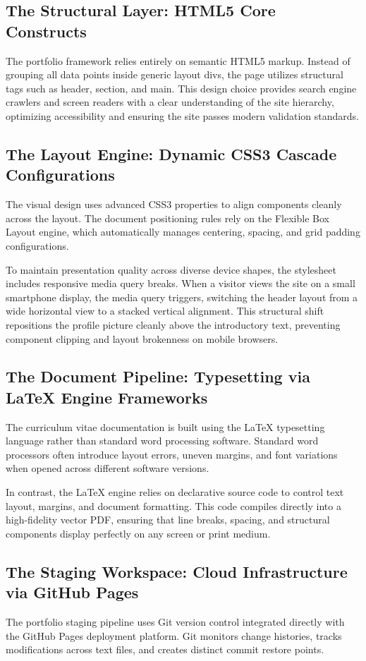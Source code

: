 \documentclass[12pt,a4paper]{article}
\begin{document}
\subsection{The Structural Layer: HTML5 Core Constructs}
The portfolio framework relies entirely on semantic HTML5 markup. Instead of grouping all data points inside generic layout divs, the page utilizes structural tags such as header, section, and main. This design choice provides search engine crawlers and screen readers with a clear understanding of the site hierarchy, optimizing accessibility and ensuring the site passes modern validation standards.

\subsection{The Layout Engine: Dynamic CSS3 Cascade Configurations}
The visual design uses advanced CSS3 properties to align components cleanly across the layout. The document positioning rules rely on the Flexible Box Layout engine, which automatically manages centering, spacing, and grid padding configurations. 

To maintain presentation quality across diverse device shapes, the stylesheet includes responsive media query breaks. When a visitor views the site on a small smartphone display, the media query triggers, switching the header layout from a wide horizontal view to a stacked vertical alignment. This structural shift repositions the profile picture cleanly above the introductory text, preventing component clipping and layout brokenness on mobile browsers.

\subsection{The Document Pipeline: Typesetting via LaTeX Engine Frameworks}
The curriculum vitae documentation is built using the LaTeX typesetting language rather than standard word processing software. Standard word processors often introduce layout errors, uneven margins, and font variations when opened across different software versions. 

In contrast, the LaTeX engine relies on declarative source code to control text layout, margins, and document formatting. This code compiles directly into a high-fidelity vector PDF, ensuring that line breaks, spacing, and structural components display perfectly on any screen or print medium.

\subsection{The Staging Workspace: Cloud Infrastructure via GitHub Pages}
The portfolio staging pipeline uses Git version control integrated directly with the GitHub Pages deployment platform. Git monitors change histories, tracks modifications across text files, and creates distinct commit restore points. 
\end{document}
